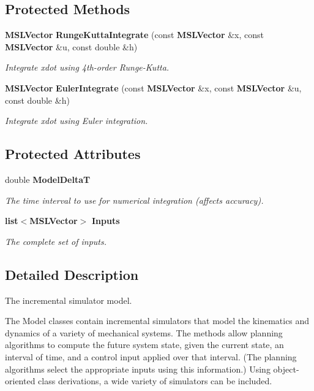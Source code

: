 \subsection*{Protected Methods}
\begin{CompactItemize}
\item 
{\bf MSLVector} {\bf Runge\-Kutta\-Integrate} (const {\bf MSLVector} \&x, const {\bf MSLVector} \&u, const double \&h)
\begin{CompactList}\small\item\em Integrate xdot using 4th-order Runge-Kutta.\item\end{CompactList}\item 
{\bf MSLVector} {\bf Euler\-Integrate} (const {\bf MSLVector} \&x, const {\bf MSLVector} \&u, const double \&h)
\begin{CompactList}\small\item\em Integrate xdot using Euler integration.\item\end{CompactList}\end{CompactItemize}
\subsection*{Protected Attributes}
\begin{CompactItemize}
\item 
double {\bf Model\-Delta\-T}
\begin{CompactList}\small\item\em The time interval to use for numerical integration (affects accuracy).\item\end{CompactList}\item 
{\bf list}$<${\bf MSLVector}$>$ {\bf Inputs}
\begin{CompactList}\small\item\em The complete set of inputs.\item\end{CompactList}\end{CompactItemize}


\subsection{Detailed Description}
The incremental simulator model.

The Model classes contain incremental simulators that model the kinematics and dynamics of a variety of mechanical systems. The methods allow planning algorithms to compute the future system state, given the current state, an interval of time, and a control input applied over that interval. (The planning algorithms select the appropriate inputs using this information.) Using object-oriented class derivations, a wide variety of simulators can be included. 



